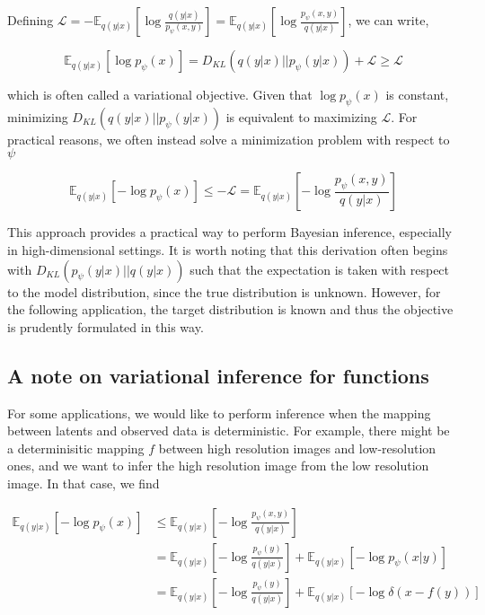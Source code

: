 Defining $\mathcal{L} = -\mathbb{E}_{q(y \lvert x)}\left[\log \frac{q(y\lvert x)}{p_{\psi}(x,y)} \right]  = \mathbb{E}_{q(y \lvert x)}\left[\log \frac{p_{\psi}(x,y)}{q(y\lvert x)} \right] $, we can write,

\begin{equation*}
\mathbb{E}_{q(y \lvert x)}\left[\log p_{\psi}(x) \right] = D_{KL}(q(y \lvert x) \lvert\lvert p_{\psi}(y\lvert x)) + \mathcal{L} \geq \mathcal{L}
\end{equation*}

which is often called a variational objective. Given that \( \log p_{\psi}(x) \) is constant, minimizing $D_{KL}(q(y \lvert x) \lvert\lvert p_{\psi}(y\lvert x))$ is equivalent to maximizing $\mathcal{L}$. For practical reasons, we often instead solve a minimization problem with respect to $\psi$

\begin{equation*}
\mathbb{E}_{q(y \lvert x)}\left[-\log p_{\psi}(x) \right] \leq -\mathcal{L} = \mathbb{E}_{q(y \lvert x)}\left[-\log \frac{p_{\psi}(x,y)}{q(y\lvert x)} \right]
\end{equation*}

This approach provides a practical way to perform Bayesian inference, especially in high-dimensional settings. It is worth noting that this derivation often begins with $D_{KL}(p_{\psi}(y\lvert x) \lvert\lvert q(y \lvert x) ) $ such that the expectation is taken with respect to the model distribution, since the true distribution is unknown. However, for the following application, the target distribution is known and thus the objective is prudently formulated in this way. 


\subsection{A note on variational inference for functions}

For some applications, we would like to perform inference when the mapping between latents and observed data is deterministic. For example, there might be a determinisitic mapping $f$ between high resolution images and low-resolution ones, and we want to infer the high resolution image from the low resolution image. In that case, we find

\begin{align*}
\mathbb{E}_{q(y \lvert x)}\left[-\log p_{\psi}(x) \right] &\leq \mathbb{E}_{q(y \lvert x)}\left[-\log \frac{p_{\psi}(x,y)}{q(y\lvert x)} \right]\\
&= \mathbb{E}_{q(y \lvert x)}\left[-\log \frac{p_{\psi}(y)}{q(y\lvert x)} \right] + \mathbb{E}_{q(y \lvert x)}\left[-\log p_{\psi}(x\lvert y) \right] \\
&= \mathbb{E}_{q(y \lvert x)}\left[-\log \frac{p_{\psi}(y)}{q(y\lvert x)} \right] + \mathbb{E}_{q(y \lvert x)}\left[-\log \delta(x-f(y)) \right] 
\end{align*}

